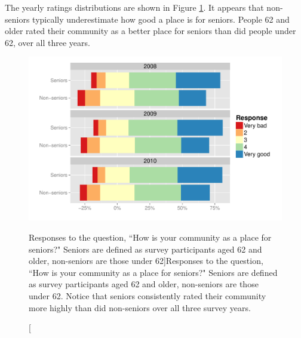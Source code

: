 \documentclass[smallextended]{svjour3}\usepackage[]{graphicx}\usepackage[]{color}
\newenvironment{knitrout}{}{} %
\begin{document}
The yearly ratings distributions are shown in Figure \ref{fig:seniorOverallPlot}. It appears that non-seniors typically underestimate how good a place is for seniors. People 62 and older rated their community as a better place for seniors than did people under 62, over all three years.  

\begin{knitrout}
\color{fgcolor}\begin{figure}

{\centering \includegraphics[width=0.99\linewidth]{figure/seniorOverallPlot-1} 

}

\caption[Responses to the question, ``How is your community as a place for seniors?" Seniors are defined as survey participants aged 62 and older, non-seniors are those under 62]{Responses to the question, ``How is your community as a place for seniors?" Seniors are defined as survey participants aged 62 and older, non-seniors are those under 62. Notice that seniors consistently rated their community more highly than did non-seniors over all three survey years.}\label{fig:seniorOverallPlot}
\end{figure}


\end{knitrout}
\end{document}
